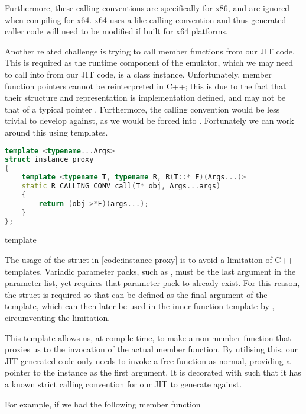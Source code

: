 Furthermore, these calling conventions are specifically for x86, and are ignored when compiling for x64. x64 uses a  like calling convention \cite{msvc-x64-calling-conv} and thus generated caller code will need to be modified if built for x64 platforms.

Another related challenge is trying to call member functions from our JIT code. This is required as the runtime component of the emulator, which we may need to call into from our JIT code, is a class instance. Unfortunately, member function pointers cannot be reinterpreted in C++; this is due to the fact that their structure and representation is implementation defined, and may not be that of a typical pointer \cite{ptrs_to_member_funcs}. Furthermore, the calling convention would be less trivial to develop against, as we would be forced into . Fortunately we can work around this using templates.

\begin{lstfloat}[H]
    \begin{lstlisting}[language=c++]
template <typename...Args>
struct instance_proxy
{
    template <typename T, typename R, R(T::* F)(Args...)>
    static R CALLING_CONV call(T* obj, Args...args)
    {
        return (obj->*F)(args...);
    }
};
    \end{lstlisting}
    \caption{ template}
    \label{code:instance-proxy}
\end{lstfloat}

The usage of the struct in \autoref{code:instance-proxy} is to avoid a limitation of C++ templates. Variadic parameter packs, such as , must be the last argument in the parameter list, yet  requires that parameter pack to already exist. For this reason, the struct is required so that  can be defined as the final argument of the template, which can then later be used in the inner function template by , circumventing the limitation.

This template allows us, at compile time, to make a non member function that proxies us to the invocation of the actual member function. By utilising this, our JIT generated code only needs to invoke a free function as normal, providing a pointer to the instance as the first argument. It is decorated with  such that it has a known strict calling convention for our JIT to generate against.

For example, if we had the following member function

